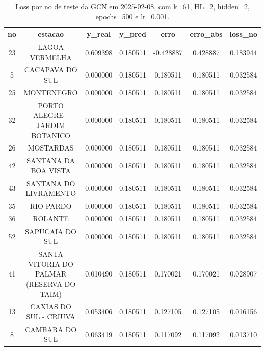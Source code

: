 \begin{table}[h]
\centering
\caption{Loss por no de teste da GCN em 2025-02-08, com k=61, HL=2, hidden=2, epochs=500 e lr=0.001.}
\label{tab:gcn_loss_k61_hl2_h2_e500_d20250208}
\begin{tabular}{ccccccc}
\toprule
no & estacao & y\_real & y\_pred & erro & erro\_abs & loss\_no \\
\midrule
23 & LAGOA VERMELHA & 0.609398 & 0.180511 & -0.428887 & 0.428887 & 0.183944 \\
5 & CACAPAVA DO SUL & 0.000000 & 0.180511 & 0.180511 & 0.180511 & 0.032584 \\
25 & MONTENEGRO & 0.000000 & 0.180511 & 0.180511 & 0.180511 & 0.032584 \\
32 & PORTO ALEGRE - JARDIM BOTANICO & 0.000000 & 0.180511 & 0.180511 & 0.180511 & 0.032584 \\
26 & MOSTARDAS & 0.000000 & 0.180511 & 0.180511 & 0.180511 & 0.032584 \\
42 & SANTANA DA BOA VISTA & 0.000000 & 0.180511 & 0.180511 & 0.180511 & 0.032584 \\
43 & SANTANA DO LIVRAMENTO & 0.000000 & 0.180511 & 0.180511 & 0.180511 & 0.032584 \\
35 & RIO PARDO & 0.000000 & 0.180511 & 0.180511 & 0.180511 & 0.032584 \\
36 & ROLANTE & 0.000000 & 0.180511 & 0.180511 & 0.180511 & 0.032584 \\
52 & SAPUCAIA DO SUL & 0.000000 & 0.180511 & 0.180511 & 0.180511 & 0.032584 \\
41 & SANTA VITORIA DO PALMAR (RESERVA DO TAIM) & 0.010490 & 0.180511 & 0.170021 & 0.170021 & 0.028907 \\
13 & CAXIAS DO SUL - CRIUVA & 0.053406 & 0.180511 & 0.127105 & 0.127105 & 0.016156 \\
8 & CAMBARA DO SUL & 0.063419 & 0.180511 & 0.117092 & 0.117092 & 0.013710 \\
\bottomrule
\end{tabular}
\end{table}
